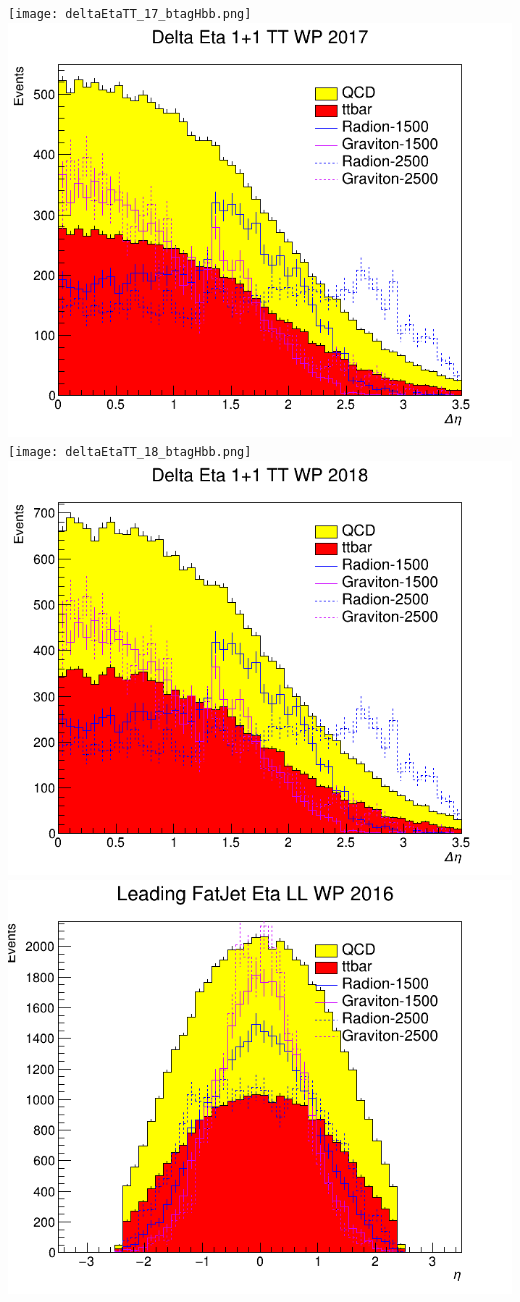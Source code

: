 \texttt{[image: deltaEtaTT\_17\_btagHbb.png]}
\includegraphics[width=1\textwidth]{deltaEtaTT_17_deepTagMD_HbbvsQCD.png}
\texttt{[image: deltaEtaTT\_18\_btagHbb.png]}
\includegraphics[width=1\textwidth]{deltaEtaTT_18_deepTagMD_HbbvsQCD.png}
\includegraphics[width=1\textwidth]{eta0LL_16_btagHbb.png}
